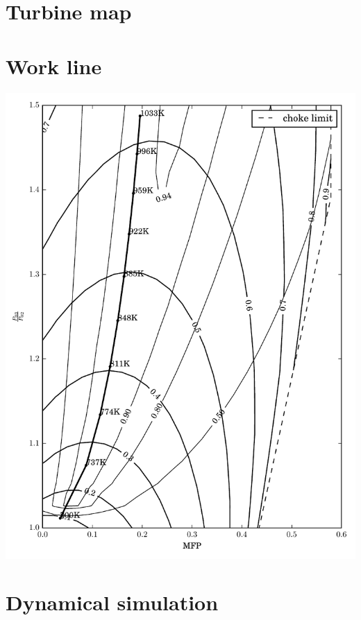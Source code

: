 \documentclass[tcc]{subfiles}
\begin{document}
\section{Turbine map}
\section{Work line}
\includegraphics{src/working_line_compressor.pdf}

\section{Dynamical simulation}




\end{document}
